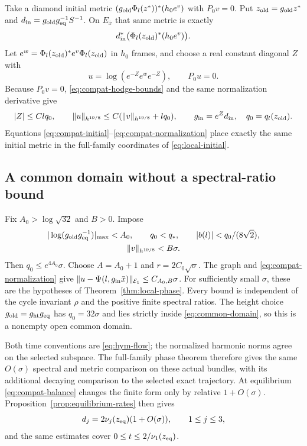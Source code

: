 \documentclass[11pt]{amsart}
\theoremstyle{definition}
\theoremstyle{remark}
\begin{document}
Take a diamond initial metric
$(g_{\rm old}\Phi_l(z^*))^*(h_0e^v)$ with $P_0v=0$.
Put $z_{\rm old}=g_{\rm old}z^*$ and
$d_{\rm in}=g_{\rm old}g_{\rm eq}^{-1}S^{-1}$.
On $E_{\bar x}$ that same metric is exactly
\begin{equation}\label{eq:compat-initial}
 d_{\rm in}^*\bigl(\Phi_l(z_{\rm old})^*(h_0e^v)\bigr).
\end{equation}
Let $e^w=\Phi_l(z_{\rm old})^*e^v\Phi_l(z_{\rm old})$ in
$h_0$ frames, and choose a real constant diagonal $Z$ with
\[
 u=\log(e^{-Z}e^we^{-Z}),\qquad P_0u=0.
\]
Because $P_0v=0$, \eqref{eq:compat-hodge-bounds} and the same
normalization derivative give
\begin{equation}\label{eq:compat-normalization}
 |Z|\le Clq_0,\qquad
 \|u\|_{h^{19/8}}\le C(\|v\|_{h^{19/8}}+lq_0),\qquad
 g_{\rm in}=e^Zd_{\rm in},\quad q_0=q_l(z_{\rm old}).
\end{equation}
Equations \eqref{eq:compat-initial}--\eqref{eq:compat-normalization}
place exactly the same initial metric in the full-family
coordinates of \eqref{eq:local-initial}.

\subsection{A common domain without a spectral-ratio bound}
Fix $A_0>\log\sqrt{32}$ and $B>0$. Impose
\begin{equation}\label{eq:common-domain}
 \begin{gathered}
 |\log(g_{\rm old}g_{\rm eq}^{-1})|_{\max}<A_0,\qquad
 q_0<q_*,\qquad |b(l)|<q_0/(8\sqrt2),\\
 \|v\|_{h^{19/8}}<B\sigma .
 \end{gathered}
\end{equation}
Then $q_0\le e^{4A_0}\sigma$. Choose
$A=A_0+1$ and $r=2C_0\sqrt\sigma$. The graph and
\eqref{eq:compat-normalization} give
$\|u-\Psi(l,g_{\rm in}\bar x)\|_{\mathcal E_1}
\le C_{A_0,B}\sigma$.
For sufficiently small $\sigma$, these are the hypotheses of
Theorem~\ref{thm:local-phase}. Every bound is independent of
the cycle invariant $\rho$ and the positive finite spectral ratios.
The height choice $g_{\rm old}=g_{\rm ht}g_{\rm eq}$ has
$q_0=32\sigma$ and lies strictly inside
\eqref{eq:common-domain}, so this is a nonempty open common domain.

Both time conventions are \eqref{eq:hym-flow}; the normalized
harmonic norms agree on the selected subspace. The full-family
phase theorem therefore gives the same $O(\sigma)$ spectral
and metric comparison on these actual bundles, with its additional
decaying comparison to the selected exact trajectory. At
equilibrium \eqref{eq:compat-balance} changes the finite form
only by relative $1+O(\sigma)$. Proposition~\ref{prop:equilibrium-rates}
then gives
\[
 d_j=2\nu_j(z_{\rm eq})(1+O(\sigma)),\qquad 1\le j\le3 ,
\]
and the same estimates cover $0\le t\le2/\nu_1(z_{\rm eq})$.
\end{document}
